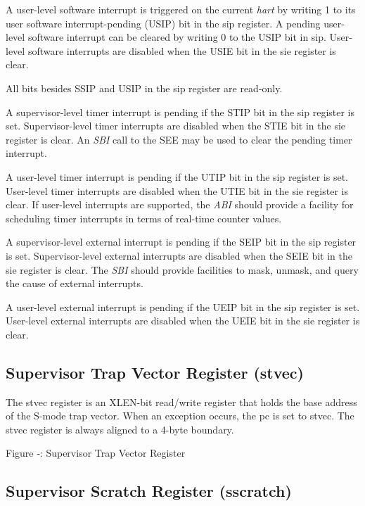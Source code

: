 A user-level software interrupt is triggered on the current \emph{hart}
by writing 1 to its user software interrupt-pending (USIP) bit in the
sip register. A pending user-level software interrupt can be cleared by
writing 0 to the USIP bit in sip. User-level software interrupts are
disabled when the USIE bit in the sie register is clear.

All bits besides SSIP and USIP in the sip register are read-only.

A supervisor-level timer interrupt is pending if the STIP bit in the sip
register is set. Supervisor-level timer interrupts are disabled when the
STIE bit in the sie register is clear. An \emph{SBI} call to the SEE may
be used to clear the pending timer interrupt.

A user-level timer interrupt is pending if the UTIP bit in the sip
register is set. User-level timer interrupts are disabled when the UTIE
bit in the sie register is clear. If user-level interrupts are
supported, the \emph{ABI} should provide a facility for scheduling timer
interrupts in terms of real-time counter values.

A supervisor-level external interrupt is pending if the SEIP bit in the
sip register is set. Supervisor-level external interrupts are disabled
when the SEIE bit in the sie register is clear. The \emph{SBI} should
provide facilities to mask, unmask, and query the cause of external
interrupts.

A user-level external interrupt is pending if the UEIP bit in the sip
register is set. User-level external interrupts are disabled when the
UEIE bit in the sie register is clear.

\subsection{Supervisor Trap Vector Register
(stvec)}\label{supervisor-trap-vector-register-stvec}

The stvec register is an XLEN-bit read/write register that holds the
base address of the S-mode trap vector. When an exception occurs, the pc
is set to stvec. The stvec register is always aligned to a 4-byte
boundary.

\missingfigure{}

Figure ‑: Supervisor Trap Vector Register

\subsection{Supervisor Scratch Register (sscratch)
}\label{supervisor-scratch-register-sscratch}

